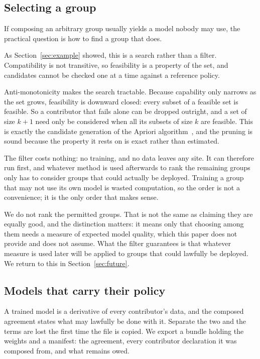 \documentclass[sigconf,anonymous,review]{acmart}
\begin{document}
\subsection{Selecting a group}
\label{sec:selection}

If composing an arbitrary group usually yields a model nobody may use, the
practical question is how to find a group that does.

As Section~\ref{sec:example} showed, this is a search rather than a filter.
Compatibility is not transitive, so feasibility is a property of the set, and
candidates cannot be checked one at a time against a reference policy.

Anti-monotonicity makes the search tractable. Because capability only narrows as
the set grows, feasibility is downward closed: every subset of a feasible set is
feasible. So a contributor that fails alone can be dropped outright, and a set of
size $k+1$ need only be considered when all its subsets of size $k$ are feasible.
This is exactly the candidate generation of the Apriori algorithm~\cite{apriori},
and the pruning is sound because the property it rests on is exact rather than
estimated.

The filter costs nothing: no training, and no data leaves any site. It can
therefore run first, and whatever method is used afterwards to rank the remaining
groups only has to consider groups that could actually be deployed. Training a
group that may not use its own model is wasted computation, so the order is not a
convenience; it is the only order that makes sense.

We do not rank the permitted groups. That is not the same as claiming they are
equally good, and the distinction matters: it means only that choosing among them
needs a measure of expected model quality, which this paper does not provide and
does not assume. What the filter guarantees is that whatever measure is used later
will be applied to groups that could lawfully be deployed. We return to this in
Section~\ref{sec:future}.

\subsection{Models that carry their policy}
\label{sec:bundle}

A trained model is a derivative of every contributor's data, and the composed
agreement states what may lawfully be done with it. Separate the two and the
terms are lost the first time the file is copied. We export a bundle holding the
weights and a manifest: the agreement, every contributor declaration it was
composed from, and what remains owed.
\end{document}
